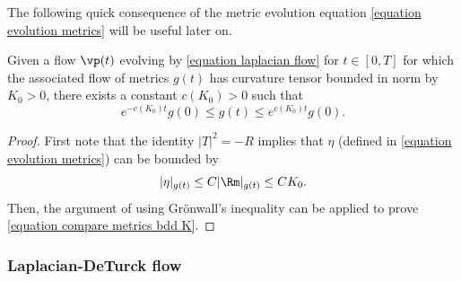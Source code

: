 \documentclass[hidelinks, 12pt, oneside, reqno]{amsart}
\begin{document}
The following quick consequence of the metric evolution equation \eqref{equation evolution metrics} will be useful later on. 

\begin{cor}
    Given a flow $\vp(t)$ evolving by \eqref{equation laplacian flow} for $t \in [0,T]$ for which the associated flow of metrics $g(t)$ has curvature tensor bounded in norm by $K_0 > 0$, there exists a constant $c(K_0) > 0$ such that 
    \begin{equation}\label{equation compare metrics bdd K}
    e^{-c(K_0)t} g(0) \le g(t) \le e^{c(K_0)t} g(0).
    \end{equation}
\end{cor}

\begin{proof}
    First note that the identity $|T|^2 = -R$ implies that $\eta$ (defined in \eqref{equation evolution metrics}) can be bounded by
    \[
    |\eta|_{g(t)} \le C|\Rm|_{g(t)} \le CK_0.
    \]
    Then, the argument of \cite[p. 225]{ShiDeforming} using Gr\"onwall's inequality can be applied to prove \eqref{equation compare metrics bdd K}.
\end{proof}

\subsubsection{Laplacian-DeTurck flow}
\end{document}

